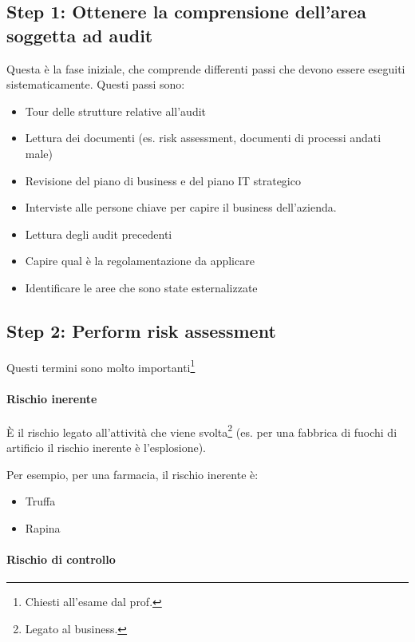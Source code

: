 \subsection{Step 1: Ottenere la comprensione dell'area soggetta ad audit}

Questa è la fase iniziale, che comprende differenti passi che devono essere 
eseguiti sistematicamente.
Questi passi sono:
\begin{itemize} 
\item Tour delle strutture relative all'audit
\item Lettura dei documenti (es. risk assessment, documenti di processi andati 
male)
\item Revisione del piano di business e del piano IT strategico
\item Interviste alle persone chiave per capire il business dell'azienda.
\item Lettura degli audit precedenti
\item Capire qual è la regolamentazione da applicare
\item Identificare le aree che sono state esternalizzate
\end{itemize}

\subsection{Step 2: Perform risk assessment} 

Questi termini sono molto importanti\footnote{Chiesti all'esame dal prof.}

\paragraph*{Rischio inerente}

È il rischio legato all'attività che viene svolta\footnote{Legato al business.} 
(es. per una fabbrica di fuochi di artificio il rischio inerente è 
l'esplosione).

Per esempio, per una farmacia, il rischio inerente è:
\begin{itemize}
\item Truffa
\item Rapina
\end{itemize}

\paragraph*{Rischio di controllo}

